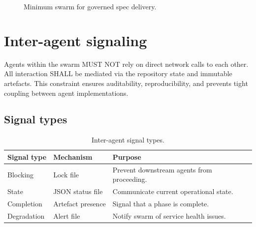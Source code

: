 \documentclass[11pt,a4paper,twoside]{report}
\begin{document}
\begin{figure}[htbp]
\centering
{}
\caption{Minimum swarm for governed spec delivery.}
\label{fig:swarm}
\end{figure}

\section{Inter-agent signaling}
\label{sec:inter-agent-signaling}

Agents within the swarm MUST NOT rely on direct network calls to each
other. All interaction SHALL be mediated via the repository state and
immutable artefacts. This constraint ensures auditability, reproducibility,
and prevents tight coupling between agent implementations.

\subsection{Signal types}

\begin{table}[htbp]
\centering
\footnotesize
\caption{Inter-agent signal types.}
\label{tab:signal-types}
\begin{tabularx}{\textwidth}{@{}l l X@{}}
\toprule
\textbf{Signal type} & \textbf{Mechanism} & \textbf{Purpose} \\
\midrule
Blocking & Lock file & Prevent downstream agents from proceeding. \\
State & JSON status file & Communicate current operational state. \\
Completion & Artefact presence & Signal that a phase is complete. \\
Degradation & Alert file & Notify swarm of service health issues. \\
\bottomrule
\end{tabularx}
\end{table}
\end{document}
